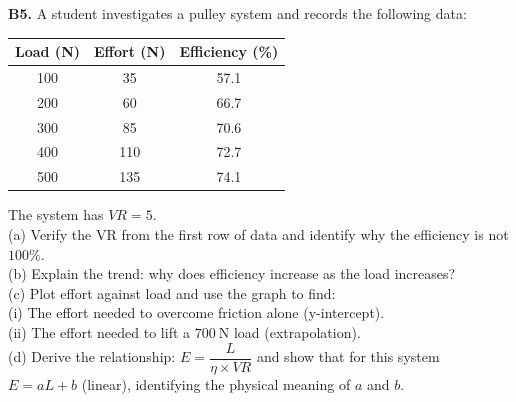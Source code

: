\begin{exercisebox}[10]
\vspace{0.4cm}

\textbf{B5.} A student investigates a pulley system
and records the following data:

\begin{center}
\begin{tabular}{ccc}
\toprule
Load (N) & Effort (N) & Efficiency (\%)\\
\midrule
100 & 35 & 57.1\\
200 & 60 & 66.7\\
300 & 85 & 70.6\\
400 & 110 & 72.7\\
500 & 135 & 74.1\\
\bottomrule
\end{tabular}
\end{center}

The system has $VR = 5$.\\[4pt]
(a) Verify the VR from the first row of data and
identify why the efficiency is not $100\%$.\\
(b) Explain the trend: why does efficiency increase
as the load increases?\\
(c) Plot effort against load and use the graph
to find:\\
\quad (i) The effort needed to overcome friction
alone (y-intercept).\\
\quad (ii) The effort needed to lift a $700\ \text{N}$
load (extrapolation).\\
(d) Derive the relationship:
$E = \dfrac{L}{\eta \times VR}$ and show that for
this system $E = aL + b$ (linear), identifying
the physical meaning of $a$ and $b$.
\hfill{}

\end{exercisebox}
